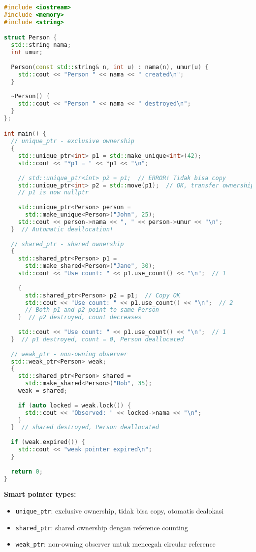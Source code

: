 \documentclass[../main.tex]{subfiles}
\begin{document}
\begin{lstlisting}[language=C++, caption={Smart pointers di C++}]
#include <iostream>
#include <memory>
#include <string>

struct Person {
  std::string nama;
  int umur;
  
  Person(const std::string& n, int u) : nama(n), umur(u) {
    std::cout << "Person " << nama << " created\n";
  }
  
  ~Person() {
    std::cout << "Person " << nama << " destroyed\n";
  }
};

int main() {
  // unique_ptr - exclusive ownership
  {
    std::unique_ptr<int> p1 = std::make_unique<int>(42);
    std::cout << "*p1 = " << *p1 << "\n";
    
    // std::unique_ptr<int> p2 = p1;  // ERROR! Tidak bisa copy
    std::unique_ptr<int> p2 = std::move(p1);  // OK, transfer ownership
    // p1 is now nullptr
    
    std::unique_ptr<Person> person = 
      std::make_unique<Person>("John", 25);
    std::cout << person->nama << ", " << person->umur << "\n";
  }  // Automatic deallocation!
  
  // shared_ptr - shared ownership
  {
    std::shared_ptr<Person> p1 = 
      std::make_shared<Person>("Jane", 30);
    std::cout << "Use count: " << p1.use_count() << "\n";  // 1
    
    {
      std::shared_ptr<Person> p2 = p1;  // Copy OK
      std::cout << "Use count: " << p1.use_count() << "\n";  // 2
      // Both p1 and p2 point to same Person
    }  // p2 destroyed, count decreases
    
    std::cout << "Use count: " << p1.use_count() << "\n";  // 1
  }  // p1 destroyed, count = 0, Person deallocated
  
  // weak_ptr - non-owning observer
  std::weak_ptr<Person> weak;
  {
    std::shared_ptr<Person> shared = 
      std::make_shared<Person>("Bob", 35);
    weak = shared;
    
    if (auto locked = weak.lock()) {
      std::cout << "Observed: " << locked->nama << "\n";
    }
  }  // shared destroyed, Person deallocated
  
  if (weak.expired()) {
    std::cout << "weak pointer expired\n";
  }
  
  return 0;
}
\end{lstlisting}

\textbf{Smart pointer types:}
\begin{itemize}
  \item \texttt{unique\_ptr}: exclusive ownership, tidak bisa copy, otomatis dealokasi
  \item \texttt{shared\_ptr}: shared ownership dengan reference counting
  \item \texttt{weak\_ptr}: non-owning observer untuk mencegah circular reference
\end{itemize}
\end{document}
